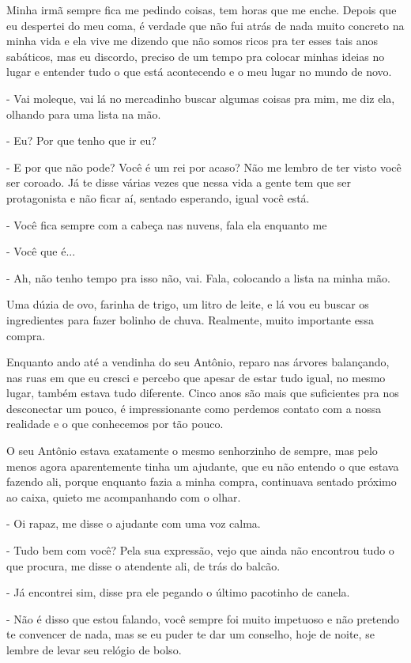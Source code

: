Minha irmã sempre fica me pedindo coisas, tem horas que me enche. Depois que eu despertei do meu coma, é verdade que não fui atrás de nada muito concreto na minha vida e ela vive me dizendo que não somos ricos pra ter esses tais anos sabáticos, mas eu discordo, preciso de um tempo pra colocar minhas ideias no lugar e entender tudo o que está acontecendo e o meu lugar no mundo de novo.

- Vai moleque, vai lá no mercadinho buscar algumas coisas pra mim, me diz ela, olhando para uma lista na mão.

- Eu? Por que tenho que ir eu?

- E por que não pode? Você é um rei por acaso? Não me lembro de ter visto você ser coroado. Já te disse várias vezes que nessa vida a gente tem que ser protagonista e não ficar aí, sentado esperando, igual você está.

- Você fica sempre com a cabeça nas nuvens, fala ela enquanto me 

- Você que é...

- Ah, não tenho tempo pra isso não, vai. Fala, colocando a lista na minha mão.

Uma dúzia de ovo, farinha de trigo, um litro de leite, e lá vou eu buscar os ingredientes para fazer bolinho de chuva. Realmente, muito importante essa compra.

Enquanto ando até a vendinha do seu Antônio, reparo nas árvores balançando, nas ruas em que eu cresci e percebo que apesar de estar tudo igual, no mesmo lugar, também estava tudo diferente. Cinco anos são mais que suficientes pra nos desconectar um pouco, é impressionante como perdemos contato com a nossa realidade e o que conhecemos por tão pouco.

O seu Antônio estava exatamente o mesmo senhorzinho de sempre, mas pelo menos agora aparentemente tinha um ajudante, que eu não entendo o que estava fazendo ali, porque enquanto fazia a minha compra, continuava sentado próximo ao caixa, quieto me acompanhando com o olhar.

- Oi rapaz, me disse o ajudante com uma voz calma. 

- Tudo bem com você? Pela sua expressão, vejo que ainda não encontrou tudo o que procura, me disse o atendente ali, de trás do balcão.

- Já encontrei sim, disse pra ele pegando o último pacotinho de canela.

- Não é disso que estou falando, você sempre foi muito impetuoso e não pretendo te convencer de nada, mas se eu puder te dar um conselho, hoje de noite, se lembre de levar seu relógio de bolso.

